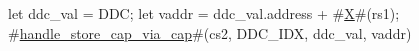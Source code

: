 let ddc_val = DDC;
let vaddr = ddc_val.address + #\hyperref[sailRISCVzX]{X}#(rs1);
#\hyperref[sailRISCVzhandlezystorezycapzyviazycap]{handle\_store\_cap\_via\_cap}#(cs2, DDC_IDX, ddc_val, vaddr)
